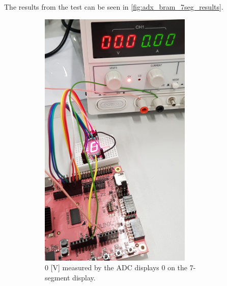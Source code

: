 \documentclass[../report.tex]{subfiles}
\begin{document}
The results from the test can be seen in \autoref{fig:adx_bram_7seg_results}.

\begin{figure}[H]
    \centering
    \begin{subfigure}[t]{0.45\textwidth}
        \centering
        \includegraphics[width=0.8\textwidth]{figures/xadc/0V_result.jpg}
        \captionsetup{width=0.8\textwidth}
        \caption{0 [V] measured by the ADC displays 0 on the 7-segment display.}  
        \label{}
    \end{subfigure}
    \begin{subfigure}[t]{0.45\textwidth}  
        \centering 

\end{subfigure}
\end{figure}
\end{document}
